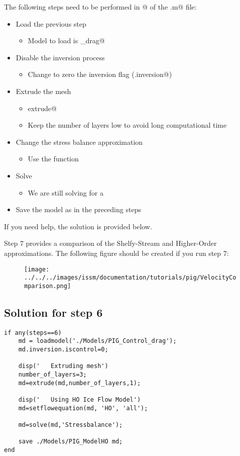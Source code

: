 The following steps need to be performed in @ of the \verb@runme.m@ file:
\begin{itemize}
	\item Load the previous step
		\begin{itemize}
			\item Model to load is \verb@Control_drag@
		\end{itemize}
	\item Disable the inversion process
		\begin{itemize}
			\item Change \verb@iscontrol@ to zero the inversion flag (\verb@md.inversion@)
		\end{itemize}
	\item Extrude the mesh
		\begin{itemize}
			\item \verb@help extrude@
			\item Keep the number of layers low to avoid long computational time
		\end{itemize}
	\item Change the stress balance approximation
		\begin{itemize}
			\item Use the function \verb@setflowequation@
		\end{itemize}
	\item Solve
		\begin{itemize}
			\item We are still solving for a \verb@StressBalanceSolution@
		\end{itemize}
	\item Save the model as in the preceding steps
\end{itemize}

If you need help, the solution is provided below.

Step 7 provides a comparison of the Shelfy-Stream and Higher-Order approximations. The following figure should be created if you run step 7:
\begin{figure}[H]
	\begin{center}
		\texttt{[image: ../../../images/issm/documentation/tutorials/pig/VelocityComparison.png]}
	\end{center}
\end{figure}
\subsection{Solution for step 6}%
\begin{verbatim}if any(steps==6)
	md = loadmodel('./Models/PIG_Control_drag');
	md.inversion.iscontrol=0;

	disp('   Extruding mesh')
	number_of_layers=3;
	md=extrude(md,number_of_layers,1);

	disp('   Using HO Ice Flow Model')
	md=setflowequation(md, 'HO', 'all');

	md=solve(md,'Stressbalance');

	save ./Models/PIG_ModelHO md;
end\end{verbatim}
